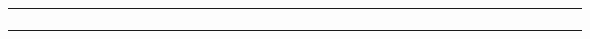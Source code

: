\documentclass{article}
\begin{document}
\begin{minipage}{\linewidth}
\begin{tabular}{|*{10}{c}*{31}{||c}|}
          & & & & & & & & & & & & & & & & & & & & & & & & & & & & & & & \\  
          & & & & & & & & & & & & & & & & & & & & & & & & & & & & & & & \\  
          & & & & & & & & & & & & & & & & & & & & & & & & & & & & & & & \\  
       & & & & & & & & & & & & & & & & & & & & & & & & & & & & & & & \\ \hline 
\end{tabular} 
\end{minipage} 
~\\ 
\end{document}
